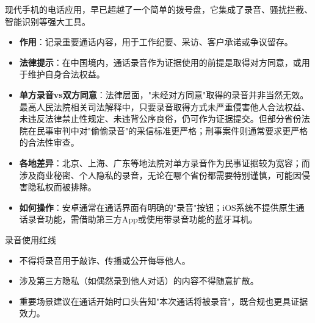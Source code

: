


现代手机的电话应用，早已超越了一个简单的拨号盘，它集成了录音、骚扰拦截、智能识别等强大工具。


\begin{itemize}
  \item \textbf{作用}：记录重要通话内容，用于工作纪要、采访、客户承诺或争议留存。
  \item \textbf{法律提示}：在中国境内，通话录音作为证据使用的前提是取得对方同意，或用于维护自身合法权益。
  \item \textbf{单方录音vs双方同意}：法律层面，"未经对方同意"取得的录音并非当然无效。最高人民法院相关司法解释中，只要录音取得方式未严重侵害他人合法权益、未违反法律禁止性规定、未违背公序良俗，仍可作为证据提交。但部分省份法院在民事审判中对"偷偷录音"的采信标准更严格；刑事案件则通常要求更严格的合法性审查。
  \item \textbf{各地差异}：北京、上海、广东等地法院对单方录音作为民事证据较为宽容；而涉及商业秘密、个人隐私的录音，无论在哪个省份都需要特别谨慎，可能因侵害隐私权而被排除。
  \item \textbf{如何操作}：安卓通常在通话界面有明确的"录音"按钮；iOS系统不提供原生通话录音功能，需借助第三方App或使用带录音功能的蓝牙耳机。
\end{itemize}

\begin{tcbwarn}{录音使用红线}
\begin{itemize}
  \item 不得将录音用于敲诈、传播或公开侮辱他人。
  \item 涉及第三方隐私（如偶然录到他人对话）的内容不得随意扩散。
  \item 重要场景建议在通话开始时口头告知"本次通话将被录音"，既合规也更具证据效力。
\end{itemize}

\end{tcbwarn}


